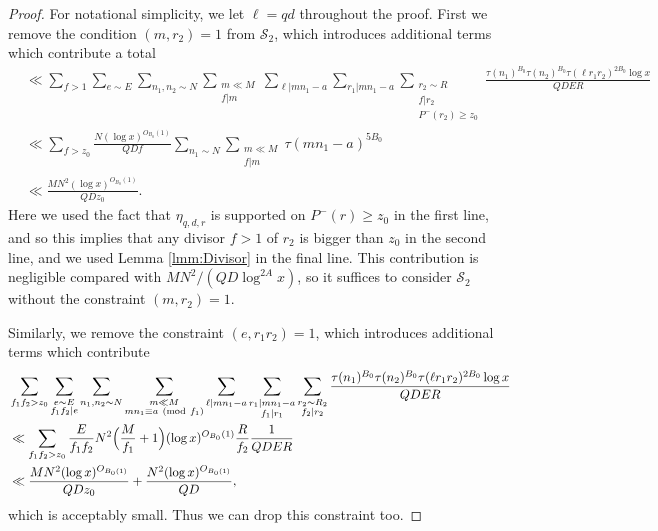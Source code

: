 \documentclass[10pt]{amsart}
\theoremstyle{plain}
\numberwithin{equation}{section}
\newcommand{\Mod}[1]{\ (\mathrm{mod}\ #1)}
\begin{document}
 \begin{proof}
For notational simplicity, we let $\ell=q d$ throughout the proof. First we remove the condition $(m,r_2)=1$ from $\mathscr{S}_2$, which introduces additional terms which contribute a total
\begin{align*}
&\ll \sum_{f>1}\sum_{e\sim E}\sum_{n_1,n_2\sim N}\sum_{\substack{m\ll M\\ f|m}}\sum_{\ell|m n_1-a}\sum_{r_1|m n_1-a}\sum_{\substack{r_2\sim R\\ f|r_2\\ P^-(r_2)\ge z_0}}\frac{\tau(n_1)^{B_0}\tau(n_2)^{B_0}\tau(\ell r_1r_2)^{2B_0}\log{x}}{Q D E R}\\
&\ll \sum_{f>z_0}\frac{N(\log{x})^{O_{B_0}(1)}}{Q D f}\sum_{n_1\sim N}\sum_{\substack{m\ll M\\ f|m}}\tau(m n_1-a)^{5B_0}\\
&\ll \frac{MN^2(\log{x})^{O_{B_0}(1)}}{Q D z_0}.
\end{align*}
Here we used the fact that $\eta_{q,d,r}$ is supported on $P^-(r)\ge z_0$ in the first line, and so this implies that any divisor $f>1$ of $r_2$ is bigger than $z_0$ in the second line, and we used Lemma \ref{lmm:Divisor} in the final line. This contribution is negligible compared with $MN^2/(Q D\log^{2A}{x})$, so it suffices to consider $\mathscr{S}_{2}$ without the constraint $(m,r_2)=1$. 

Similarly, we remove the constraint $(e,r_1r_2)=1$, which introduces additional terms which contribute
\begin{align*}
&\sum_{f_1f_2>z_0}\sum_{\substack{e\sim E\\ f_1f_2|e}}\sum_{n_1,n_2\sim N}\sum_{\substack{m\ll M\\ m n_1\equiv a\Mod{f_1}}}\sum_{\ell|m n_1-a}\sum_{\substack{r_1|m n_1-a\\ f_1|r_1}}\sum_{\substack{r_2\sim R_2\\ f_2|r_2}}\frac{\tau(n_1)^{B_0}\tau(n_2)^{B_0}\tau(\ell r_1r_2)^{2B_0}\log{x}}{Q D E R}\\
&\ll \sum_{f_1f_2>z_0}\frac{E}{f_1f_2}N^2\Bigl(\frac{M}{f_1}+1\Bigr)(\log{x})^{O_{B_0}(1)}\frac{R}{f_2}\frac{1}{Q D E R}\\
&\ll \frac{MN^2(\log{x})^{O_{B_0(1)}}}{Q D z_0}+\frac{N^2(\log{x})^{O_{B_0(1)}}}{Q D},
\end{align*}
which is acceptably small. Thus we can drop this constraint too.


\end{proof}
\end{document}
